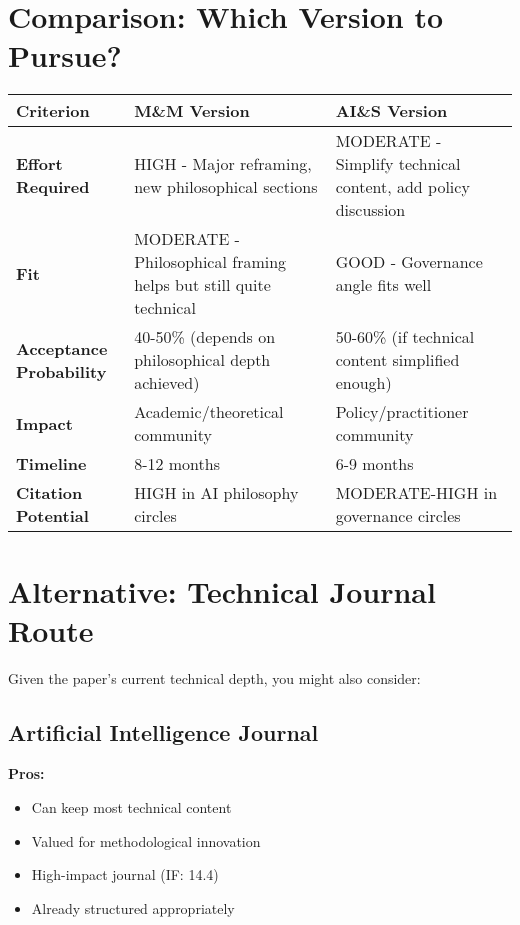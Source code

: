 \documentclass[12pt]{article}
\begin{document}
\section{Comparison: Which Version to Pursue?}

\begin{center}
\begin{tabular}{|p{3cm}|p{5.5cm}|p{5.5cm}|}
\hline
\textbf{Criterion} & \textbf{M\&M Version} & \textbf{AI\&S Version} \\
\hline
\textbf{Effort Required} & HIGH - Major reframing, new philosophical sections & MODERATE - Simplify technical content, add policy discussion \\
\hline
\textbf{Fit} & MODERATE - Philosophical framing helps but still quite technical & GOOD - Governance angle fits well \\
\hline
\textbf{Acceptance Probability} & 40-50\% (depends on philosophical depth achieved) & 50-60\% (if technical content simplified enough) \\
\hline
\textbf{Impact} & Academic/theoretical community & Policy/practitioner community \\
\hline
\textbf{Timeline} & 8-12 months & 6-9 months \\
\hline
\textbf{Citation Potential} & HIGH in AI philosophy circles & MODERATE-HIGH in governance circles \\
\hline
\end{tabular}
\end{center}

\section{Alternative: Technical Journal Route}

Given the paper's current technical depth, you might also consider:

\subsection{Artificial Intelligence Journal}

\textbf{Pros:}
\begin{itemize}[leftmargin=*]
\item Can keep most technical content
\item Valued for methodological innovation
\item High-impact journal (IF: 14.4)
\item Already structured appropriately
\end{itemize}
\end{document}
